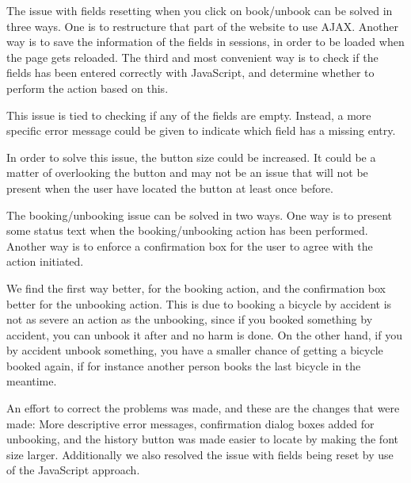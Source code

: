 \begin{description}[style=nextline]
	\item[{\#}1 Fields reset]
	The issue with fields resetting when you click on book/unbook can be solved in three ways.
	One is to restructure that part of the website to use AJAX.
	Another way is to save the information of the fields in sessions, in order to be loaded when the page gets reloaded. 
	The third and most convenient way is to check if the fields has been entered correctly with JavaScript, and determine whether to perform the action based on this.
	\item[{\#}2 Error message understandability]
	This issue is tied to checking if any of the fields are empty.
	Instead, a more specific error message could be given to indicate which field has a missing entry.
	\item[{\#}3 Difficulty finding history]
	In order to solve this issue, the button size could be increased.
	It could be a matter of overlooking the button and may not be an issue that will not be present when the user have located the button at least once before.
	\item[{\#}4 Booking/Unbooking confirmation]
	The booking/unbooking issue can be solved in two ways.
	One way is to present some status text when the booking/unbooking action has been performed.
	Another way is to enforce a confirmation box for the user to agree with the action initiated.
	
	We find the first way better, for the booking action, and the confirmation box better for the unbooking action.
	This is due to booking a bicycle by accident is not as severe an action as the unbooking, since if you booked something by accident, you can unbook it after and no harm is done.
	On the other hand, if you by accident unbook something, you have a smaller chance of getting a bicycle booked again, if for instance another person books the last bicycle in the meantime.
\end{description}

An effort to correct the problems was made, and these are the changes that were made: More descriptive error messages, confirmation dialog boxes added for unbooking, and the history button was made easier to locate by making the font size larger.
Additionally we also resolved the issue with fields being reset by use of the JavaScript approach.